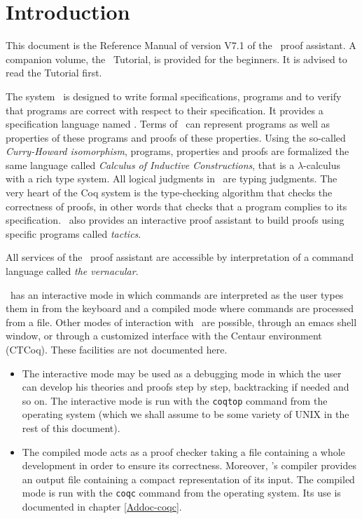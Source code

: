 \chapter*{Introduction}

This document is the Reference Manual of version V7.1 of the \Coq\ 
proof assistant. A companion volume, the \Coq\ Tutorial, is provided
for the beginners. It is advised to read the Tutorial first.

The system \Coq\ is designed to write formal specifications,
programs and to verify that programs are correct with respect to their
specification. It provides a specification language named \gallina. Terms of
\gallina\ can represent programs as well as properties of these
programs and proofs of these properties. Using the so-called
\textit{Curry-Howard isomorphism}, programs, properties and proofs are
formalized the same 
language called \textit{Calculus of Inductive Constructions}, that is
a $\lambda$-calculus with a rich type system.
All logical judgments in \Coq\ are typing judgments. The very heart of the Coq
system is the type-checking algorithm that checks the correctness of
proofs, in other words that checks that a program complies to its
specification. \Coq\ also provides an interactive proof assistant to
build proofs using specific programs called \textit{tactics}.

All services of the \Coq\ proof assistant are accessible by
interpretation of a command language called \textit{the vernacular}.

\Coq\ has an interactive mode in which commands are interpreted as the
user types them in from the keyboard and a compiled mode where
commands are processed from a file.  Other modes of interaction with
\Coq\ are possible, through an emacs shell window, or through a
customized interface with the Centaur environment (CTCoq). These
facilities are not documented here.

\begin{itemize}
\item The interactive mode may be used as a debugging mode in which
  the user can develop his theories and proofs step by step,
  backtracking if needed and so on. The interactive mode is run with
  the {\tt coqtop} command from the operating system (which we shall
  assume to be some variety of UNIX in the rest of this document).
\item The compiled mode acts as a proof checker taking a file
  containing a whole development in order to ensure its correctness.
  Moreover, \Coq's compiler provides an output file containing a
  compact representation of its input. The compiled mode is run with
  the {\tt coqc} command from the operating system. Its use is
  documented in chapter \ref{Addoc-coqc}.
\end{itemize}

